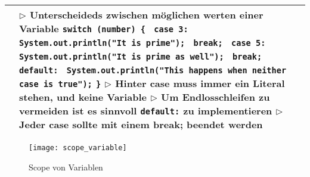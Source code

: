 \begin{table}[H]
\begin{tabular}{ | p{4cm} p{13.5cm} | }
	\makecell[l]{Switch} &
	\makecell[l]
	{
	$\rhd$ Unterscheideds zwischen möglichen werten einer Variable \\
	\hspace{0.4cm} \texttt{switch (number) \{} \\
	\hspace{0.4cm} \texttt{		case 3:} \\
	\hspace{0.4cm} \texttt{		\hspace{0.1cm} System.out.println("It is prime");} \\
	\hspace{0.4cm} \texttt{		\hspace{0.1cm} break;} \\
	\hspace{0.4cm} \texttt{		case 5:} \\
	\hspace{0.4cm} \texttt{		\hspace{0.1cm} System.out.println("It is prime as well");} \\
	\hspace{0.4cm} \texttt{		\hspace{0.1cm} break;} \\
	\hspace{0.4cm} \texttt{		default:} \\
	\hspace{0.4cm} \texttt{		\hspace{0.1cm} System.out.println("This happens when neither case is true");} \\
	\hspace{0.4cm} \texttt{\}} \\
	$\rhd$ Hinter case muss immer ein Literal stehen, und keine Variable \\
	$\rhd$ Um Endlosschleifen zu vermeiden ist es sinnvoll \texttt{default:} zu implementieren \\
	$\rhd$ Jeder case sollte mit einem break; beendet werden \\
	} \\ \hline
	
	
	\end{tabular}
	\end{table}
	
	
	
	\begin{figure}[H]
		\centering
		\texttt{[image: scope\_variable]}
		\caption{Scope von Variablen}
	\end{figure}


